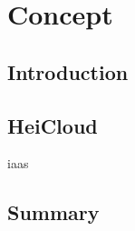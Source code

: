 \chapter{Concept}

\section{Introduction}


\section{HeiCloud}

\ac{iaas}
\cite{heicloud2021}

\section{Summary}